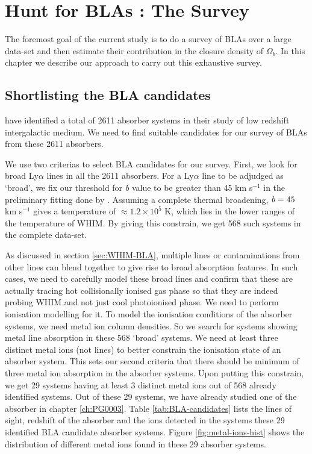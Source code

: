 \chapter{Hunt for BLAs : The Survey} \label{ch:Survey}

The foremost goal of the current study is to do a survey of BLAs over a large data-set and then estimate their contribution in the closure density of $\Omega_b$. In this chapter we describe our approach to carry out this exhaustive survey.

\section{Shortlisting the BLA candidates} \label{sec:BLA-candidates}

\citet{danforth-2016} have identified a total of 2611 absorber systems in their study of low redshift intergalactic medium. We need to find suitable candidates for our survey of BLAs from these 2611 absorbers.

We use two criterias to select BLA candidates for our survey. First, we look for broad Ly$\alpha$ lines in all the 2611 absorbers. For a Ly$\alpha$ line to be adjudged as `broad', we fix our threshold for \emph{b} value to be greater than 45 km s$^{-1}$ in the preliminary fitting done by \citet{danforth-2016}. Assuming a complete thermal broadening, $\emph{b}=45$ km s$^{-1}$ gives a temperature of $\approx 1.2 \times 10^5$ K, which lies in the lower ranges of the temperature of WHIM. By giving this constrain, we get 568 such systems in the complete data-set.

As discussed in section \ref{sec:WHIM-BLA}, multiple lines or contaminations from other lines can blend together to give rise to broad absorption features. In such cases, we need to carefully model these broad lines and confirm that these are actually tracing hot collisionally ionised gas phase so that they are indeed probing WHIM and not just cool photoionised phase. We need to perform ionisation modelling for it. To model the ionisation conditions of the absorber systems, we need metal ion column densities. So we search for systems showing metal line absorption in these 568 `broad' systems. We need at least three distinct metal ions (not lines) to better constrain the ionisation state of an absorber system. This sets our second criteria that there should be minimum of three metal ion absorption in the absorber systems. Upon putting this constrain, we get 29 systems having at least 3 distinct metal ions out of 568 already identified systems. Out of these 29 systems, we have already studied one of the absorber in chapter \ref{ch:PG0003}. Table \ref{tab:BLA-candidates} lists the lines of sight, redshift of the absorber and the ions detected in the systems these 29 identified BLA candidate absorber systems. Figure \ref{fig:metal-ions-hist} shows the distribution of different metal ions found in these 29 absorber systems. 


